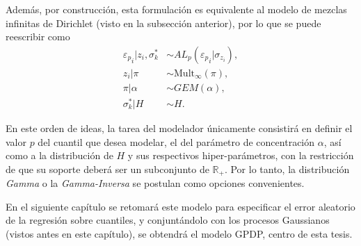 Adem\'as, por construcci\'on, esta formulaci\'on es equivalente al modelo de mezclas infinitas de Dirichlet (visto en la subsecci\'on anterior), por lo que se puede reescribir como
\begin{equation*}
\begin{aligned}
   {\varepsilon_p}_i | z_i, \sigma_k^* &\sim AL_p({\varepsilon_p}_i | \sigma_{z_i}), \\
   z_i | \pi &\sim \mathrm{Mult}_{\infty}(\pi), \\
   \pi | \alpha &\sim GEM(\alpha), \\
   \sigma_k^* | H &\sim H.
\end{aligned}
\end{equation*}

En este orden de ideas, la tarea del modelador \'unicamente consistir\'a en definir el valor $p$ del cuantil que desea modelar, el del par\'ametro de concentraci\'on $\alpha$, as\'i como a la distribuci\'on de $H$ y sus respectivos hiper-par\'ametros, con la restricci\'on de que su soporte deber\'a ser un subconjunto de $\mathbb{R}_+$. Por lo tanto, la distribuci\'on \textit{Gamma} o la \textit{Gamma-Inversa} se postulan como opciones convenientes.

En el siguiente cap\'itulo se retomar\'a este modelo para especificar el error aleatorio de la regresi\'on sobre cuantiles, y conjunt\'andolo con los procesos Gaussianos (vistos antes en este cap\'itulo), se obtendr\'a el modelo GPDP, centro de esta tesis.

\newpage